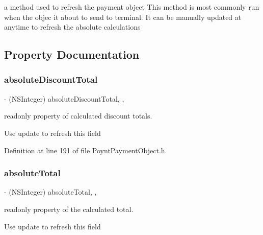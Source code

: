 a method used to refresh the payment object  This method is most commonly run when the objec it about to send to terminal. It can be manually updated at anytime to refresh the absolute calculations 



\subsection{Property Documentation}
\hypertarget{interface_poynt_payment_object_aa5f2d0bac6ddbb63f1ada849fd4609d2}{}\label{interface_poynt_payment_object_aa5f2d0bac6ddbb63f1ada849fd4609d2} 
\subsubsection{\texorpdfstring{absolute\+Discount\+Total}{absoluteDiscountTotal}}
{\footnotesize\ttfamily -\/ (N\+S\+Integer) absolute\+Discount\+Total\hspace{0.3cm}{\ttfamily [read]}, {\ttfamily [nonatomic]}, {\ttfamily [assign]}}



readonly property of calculated discount totals. 

Use update to refresh this field 

Definition at line 191 of file Poynt\+Payment\+Object.\+h.

\hypertarget{interface_poynt_payment_object_a4270b0767f8eaabd1b665c1b59bcd787}{}\label{interface_poynt_payment_object_a4270b0767f8eaabd1b665c1b59bcd787} 
\subsubsection{\texorpdfstring{absolute\+Total}{absoluteTotal}}
{\footnotesize\ttfamily -\/ (N\+S\+Integer) absolute\+Total\hspace{0.3cm}{\ttfamily [read]}, {\ttfamily [nonatomic]}, {\ttfamily [assign]}}



readonly property of the calculated total. 

Use update to refresh this field 

